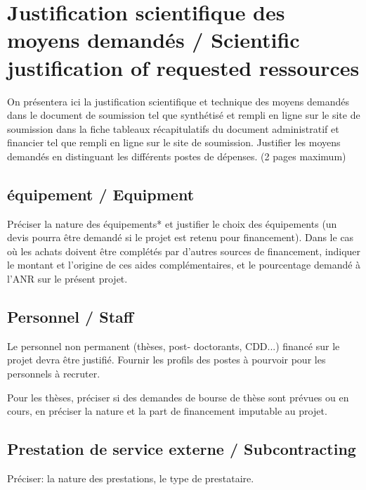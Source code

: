 
\section{Justification scientifique des moyens demand\'es / Scientific justification of requested ressources}
\begin{xcomment}  
On pr\'esentera ici la justification scientifique et technique des moyens demand\'es dans le document de soumission tel que synth\'etis\'e et rempli en ligne sur le site de soumission dans la fiche tableaux r\'ecapitulatifs  du document administratif et financier tel que rempli en ligne sur le site de soumission.
Justifier les moyens demand\'es en distinguant les diff\'erents postes de d\'epenses.
(2 pages maximum)
\end{xcomment}

\subsection{\'equipement / Equipment}
\begin{xcomment}  
Pr\'eciser la nature des \'equipements* et justifier le choix des \'equipements (un devis pourra être demand\'e si le projet est retenu pour financement).
Dans le cas où les achats doivent être compl\'et\'es par d'autres sources de financement, indiquer le montant et l'origine de ces aides compl\'ementaires, et le pourcentage demand\'e à l'ANR sur le pr\'esent projet.
\end{xcomment}

\subsection{Personnel / Staff}
\begin{xcomment}  
Le personnel non permanent (th\`eses, post- doctorants, CDD...) financ\'e sur le projet devra être justifi\'e.
Fournir  les profils des postes à pourvoir pour les personnels à recruter.

Pour les th\`eses, pr\'eciser si des demandes de bourse de th\`ese sont pr\'evues ou en cours, en pr\'eciser la nature et la part de financement imputable au projet. 
\end{xcomment}

\subsection{Prestation de service externe / Subcontracting}
\begin{xcomment}  
Pr\'eciser:
la nature des prestations,
le type de prestataire.

\end{xcomment}

